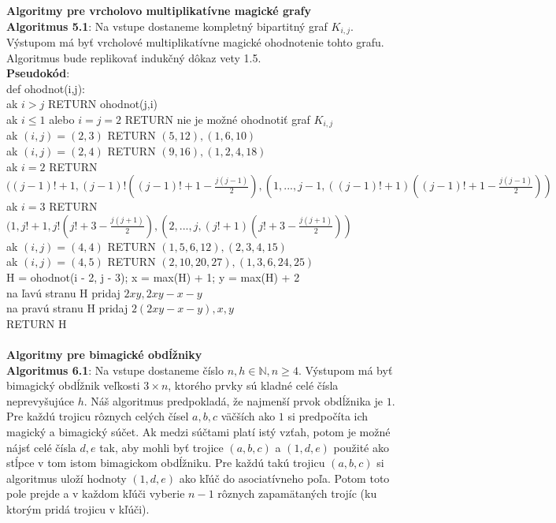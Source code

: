 \documentclass[12pt]{article}
\begin{document}
\textbf{Algoritmy pre vrcholovo multiplikatívne magické grafy} \\

\textbf{Algoritmus 5.1}: Na vstupe dostaneme kompletný bipartitný graf $K_{i,j}$. Výstupom má byť vrcholové multiplikatívne magické ohodnotenie tohto grafu. Algoritmus bude replikovať indukčný dôkaz vety 1.5. \\

\textbf{Pseudokód}: \\
def ohodnot(i,j): \\
ak $i > j$ RETURN ohodnot(j,i) \\
ak $i \leq 1$ alebo $i = j = 2$ RETURN nie je možné ohodnotiť graf $K_{i,j}$ \\
ak $(i, j) = (2,3)$ RETURN $(5, 12), (1, 6, 10)$ \\
ak $(i, j) = (2,4)$ RETURN $(9, 16), (1, 2, 4, 18)$ \\
ak $i = 2$ RETURN $((j-1)! + 1, (j-1)! ((j-1)! + 1 - \frac{j(j-1)}{2}), (1, ... , j-1, ((j-1)! + 1) ((j-1)! + 1 - \frac{j(j-1)}{2}))$ \\
ak $i = 3$ RETURN $(1, j! + 1, j! (j! + 3 - \frac{j(j+1)}{2}), (2, ... , j, (j! + 1) (j! + 3 - \frac{j(j+1)}{2}))$ \\
ak $(i, j) = (4,4)$ RETURN $(1, 5, 6, 12), (2, 3, 4, 15)$ \\
ak $(i, j) = (4,5)$ RETURN $(2, 10, 20, 27), (1, 3, 6, 24, 25)$ \\
H = ohodnot(i - 2, j - 3); x = max(H) + 1; y = max(H) + 2 \\
na ľavú stranu H pridaj $2xy, 2xy - x - y$ \\
na pravú stranu H pridaj $2(2xy - x - y), x, y$ \\
RETURN H \\\\


\textbf{Algoritmy pre bimagické obdĺžniky} \\

\textbf{Algoritmus 6.1}: Na vstupe dostaneme číslo $n,h \in \mathbb{N}, n \geq 4$. Výstupom má byť bimagický obdĺžnik veľkosti $3 \times n$, ktorého prvky sú kladné celé čísla neprevyšujúce $h$. Náš algoritmus predpokladá, že najmenší prvok obdĺžnika je $1$. Pre každú trojicu rôznych celých čísel $a,b,c$ väčších ako $1$ si predpočíta ich magický a bimagický súčet. Ak medzi súčtami platí istý vzťah, potom je možné nájsť celé čísla $d,e$ tak, aby mohli byť trojice $(a,b,c)$ a $(1,d,e)$ použité ako stĺpce v tom istom bimagickom obdĺžniku. Pre každú takú trojicu $(a,b,c)$ si algoritmus uloží hodnoty $(1,d,e)$ ako kľúč do asociatívneho poľa. Potom toto pole prejde a v každom kľúči vyberie $n-1$ rôznych zapamätaných trojíc (ku ktorým pridá trojicu v kľúči). \\
\end{document}
